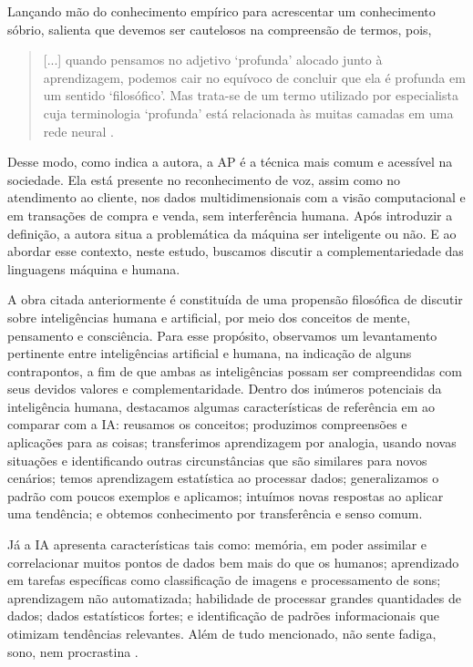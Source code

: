 \documentclass[portuguese]{textolivre}
\begin{document}
Lançando mão do conhecimento empírico para acrescentar um conhecimento sóbrio, \textcite{santaella2023inteligencia} salienta que devemos ser cautelosos na compreensão de termos, pois,

\begin{quote}
    [...] quando pensamos no adjetivo ‘profunda’ alocado junto à aprendizagem, podemos cair no equívoco de concluir que ela é profunda em um sentido ‘filosófico’. Mas trata-se de um termo utilizado por especialista cuja terminologia ‘profunda’ está relacionada às muitas camadas em uma rede neural \cite[p. 174, grifos das autoras]{santaella2023inteligencia}.
\end{quote}

Desse modo, como indica a autora, a AP é a técnica mais comum e acessível na sociedade. Ela está presente no reconhecimento de voz, assim como no atendimento ao cliente, nos dados multidimensionais com a visão computacional e em transações de compra e venda, sem interferência humana. Após introduzir a definição, a autora situa a problemática da máquina ser inteligente ou não. E ao abordar esse contexto, neste estudo, buscamos discutir a complementariedade das linguagens máquina e humana.

A obra citada anteriormente é constituída de uma propensão filosófica de discutir sobre inteligências humana e artificial, por meio dos conceitos de mente, pensamento e consciência. Para esse propósito, observamos um levantamento pertinente entre inteligências artificial e humana, na indicação de alguns contrapontos, a fim de que ambas as inteligências possam ser compreendidas com seus devidos valores e complementaridade. Dentro dos inúmeros potenciais da inteligência humana, destacamos algumas características de referência em \textcite{santaella2023inteligencia} ao comparar com a IA: reusamos os conceitos; produzimos compreensões e aplicações para as coisas; transferimos aprendizagem por analogia, usando novas situações e identificando outras circunstâncias que são similares para novos cenários; temos aprendizagem estatística ao processar dados; generalizamos o padrão com poucos exemplos e aplicamos; intuímos novas respostas ao aplicar uma tendência; e obtemos conhecimento por transferência e senso comum.

Já a IA apresenta características tais como: memória, em poder assimilar e correlacionar muitos pontos de dados bem mais do que os humanos; aprendizado em tarefas específicas como classificação de imagens e processamento de sons; aprendizagem não automatizada; habilidade de processar grandes quantidades de dados; dados estatísticos fortes; e identificação de padrões informacionais que otimizam tendências relevantes. Além de tudo mencionado, não sente fadiga, sono, nem procrastina \cite{kaufman2021, santaella2023inteligencia}.
\end{document}
